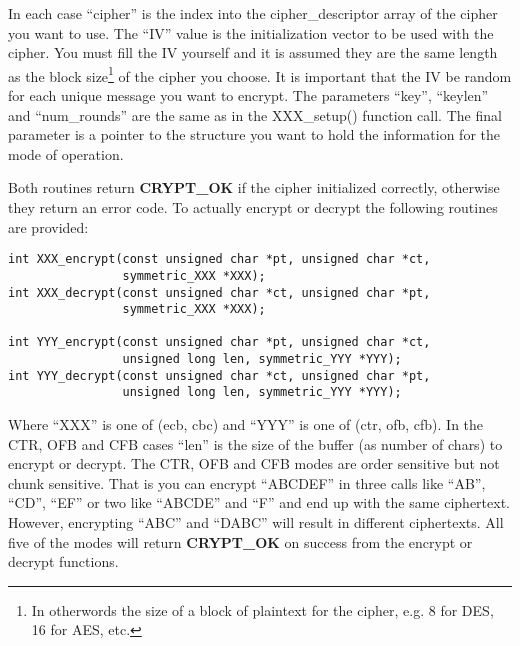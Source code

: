 \documentclass{book}
\begin{document}
In each case ``cipher'' is the index into the cipher\_descriptor array of the cipher you want to use.  The ``IV'' value is 
the initialization vector to be used with the cipher.  You must fill the IV yourself and it is assumed they are the same 
length as the block size\footnote{In otherwords the size of a block of plaintext for the cipher, e.g. 8 for DES, 16 for AES, etc.} 
of the cipher you choose.  It is important that the IV  be random for each unique message you want to encrypt.  The 
parameters ``key'', ``keylen'' and ``num\_rounds'' are the same as in the XXX\_setup() function call.  The final parameter 
is a pointer to the structure you want to hold the information for the mode of operation.

Both routines return {\bf CRYPT\_OK} if the cipher initialized correctly, otherwise they return an error code.  To 
actually encrypt or decrypt the following routines are provided:
\begin{verbatim}
int XXX_encrypt(const unsigned char *pt, unsigned char *ct, 
                symmetric_XXX *XXX);
int XXX_decrypt(const unsigned char *ct, unsigned char *pt,
                symmetric_XXX *XXX);

int YYY_encrypt(const unsigned char *pt, unsigned char *ct, 
                unsigned long len, symmetric_YYY *YYY);
int YYY_decrypt(const unsigned char *ct, unsigned char *pt, 
                unsigned long len, symmetric_YYY *YYY);
\end{verbatim}
Where ``XXX'' is one of (ecb, cbc) and ``YYY'' is one of (ctr, ofb, cfb).  In the CTR, OFB and CFB cases ``len'' is the
size of the buffer (as number of chars) to encrypt or decrypt.  The CTR, OFB and CFB modes are order sensitive but not
chunk sensitive.  That is you can encrypt ``ABCDEF'' in three calls like ``AB'', ``CD'', ``EF'' or two like ``ABCDE'' and ``F''
and end up with the same ciphertext.  However, encrypting ``ABC'' and ``DABC'' will result in different ciphertexts.  All
five of the modes will return {\bf CRYPT\_OK} on success from the encrypt or decrypt functions.
\end{document}

